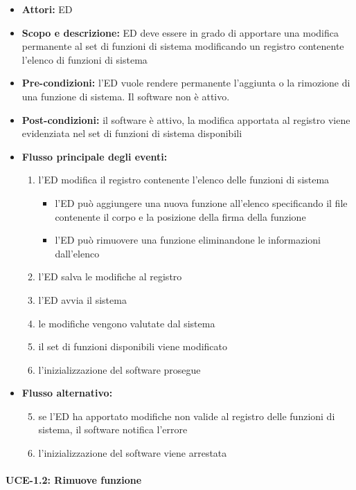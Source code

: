 \begin{itemize}
	\item \textbf{Attori:} ED
	\item \textbf{Scopo e descrizione:} ED deve essere in grado di apportare una modifica permanente al set di funzioni di sistema modificando un registro contenente l'elenco di funzioni di sistema
	\item \textbf{Pre-condizioni:} l'ED vuole rendere permanente l'aggiunta o la rimozione di una funzione di sistema. Il software non è attivo.
	\item \textbf{Post-condizioni:} il software è attivo, la modifica apportata al registro viene evidenziata nel set di funzioni di sistema disponibili
	\item \textbf{Flusso principale degli eventi:}
		\begin{enumerate}
			\item l'ED modifica il registro contenente l'elenco delle funzioni di sistema
				\begin{itemize}
					\item l'ED può aggiungere una nuova funzione all'elenco specificando il file contenente il corpo e la posizione della firma della funzione
					\item l'ED può rimuovere una funzione eliminandone le informazioni dall'elenco
				\end{itemize}
			\item l'ED salva le modifiche al registro
			\item l'ED avvia il sistema
			\item le modifiche vengono valutate dal sistema
			\item il set di funzioni disponibili viene modificato
			\item l'inizializzazione del software prosegue
		\end{enumerate}
	\item \textbf{Flusso alternativo:} 
		\begin{enumerate}
			\setcounter{enumi}{4}
			\item se l'ED ha apportato modifiche non valide al registro delle funzioni di sistema, il software notifica l'errore
			\item l'inizializzazione del software viene arrestata
		\end{enumerate}
\end{itemize}


\paragraph{UCE-1.2: Rimuove funzione}

